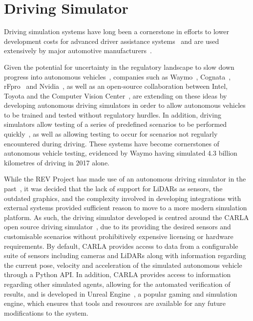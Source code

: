 \section{Driving Simulator} \label{sec:8:drivingSimulator}

Driving simulation systems have long been a cornerstone in efforts to lower development costs for advanced driver assistance systems~\cite{gietelink_development_2006, bella_collision_2011, hassan_reconfigurable_2013} and are used extensively by major automotive manufacturers~\cite{chapron_new_2007, murano_development_2009, kading_advanced_1995}.

Given the potential for uncertainty in the regulatory landscape to slow down progress into autonomous vehicles~\cite{brodsky_autonomous_2016}, companies such as Waymo~\cite{waymo_waymo_2017}, Cognata~\cite{cognata_cognata_nodate}, rFpro~\cite{rfpro_rfpro_nodate} and Nvidia~\cite{nvidia_corporation_nvidia_nodate}, as well as an open-source collaboration between Intel, Toyota and the Computer Vision Center~\cite{dosovitskiy_carla:_2017}, are extending on these ideas by developing autonomous driving simulators in order to allow autonomous vehicles to be trained and tested without regulatory hurdles.
In addition, driving simulators allow testing of a series of predefined scenarios to be performed quickly~\cite{li_intelligence_2016}, as well as allowing testing to occur for scenarios not regularly encountered during driving.
These systems have become cornerstones of autonomous vehicle testing, evidenced by Waymo having simulated 4.3 billion kilometres of driving in 2017 alone.

While the REV Project has made use of an autonomous driving simulator in the past~\cite{bradley_automotive_2009}, it was decided that the lack of support for LiDARs as sensors, the outdated graphics, and the complexity involved in developing integrations with external systems provided sufficient reason to move to a more modern simulation platform.
As such, the driving simulator developed is centred around the CARLA open source driving simulator~\cite{dosovitskiy_carla:_2017}, due to its providing the desired sensors and customisable scenarios without prohibitively expensive licensing or hardware requirements.
By default, CARLA provides access to data from a configurable suite of sensors including cameras and LiDARs along with information regarding the current pose, velocity and acceleration of the simulated autonomous vehicle through a Python API.
In addition, CARLA provides access to information regarding other simulated agents, allowing for the automated verification of results, and is developed in Unreal Engine~\cite{epic_games_unreal_nodate}, a popular gaming and simulation engine, which ensures that tools and resources are available for any future modifications to the system.

